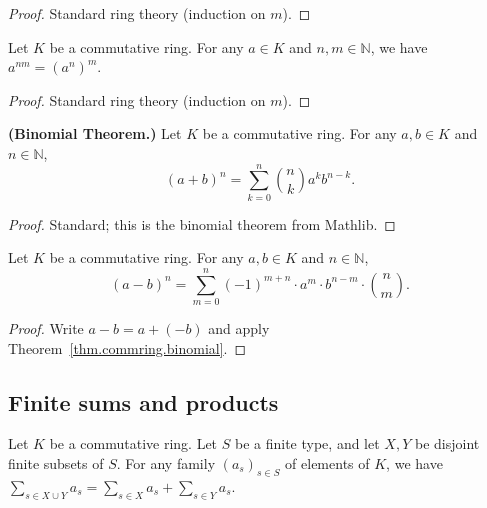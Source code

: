 \begin{proof}
\leanok
Standard ring theory (induction on $m$).
\end{proof}

\begin{lemma}
\label{lem.commring.pow-mul}
\leanhelper
\leanok
Let $K$ be a commutative ring. For any $a\in K$ and $n,m\in\mathbb{N}$, we have
$a^{nm}=\left(  a^{n}\right)  ^{m}$.
\end{lemma}

\begin{proof}
\leanok
Standard ring theory (induction on $m$).
\end{proof}

\begin{theorem}
\label{thm.commring.binomial}
\leanhelper
\leanok
\textbf{(Binomial Theorem.)}
Let $K$ be a commutative ring. For any $a,b\in K$ and $n\in\mathbb{N}$,
\[
(a+b)^n = \sum_{k=0}^{n} \binom{n}{k} a^k b^{n-k}.
\]
\end{theorem}

\begin{proof}
Standard; this is the binomial theorem from Mathlib.
\end{proof}

\begin{lemma}
\label{lem.commring.binomial-sub}
\leanhelper
\leanok
Let $K$ be a commutative ring. For any $a,b\in K$ and $n\in\mathbb{N}$,
\[
(a-b)^n = \sum_{m=0}^{n} (-1)^{m+n} \cdot a^m \cdot b^{n-m} \cdot \binom{n}{m}.
\]
\end{lemma}

\begin{proof}
\leanok
Write $a - b = a + (-b)$ and apply Theorem~\ref{thm.commring.binomial}.
\end{proof}


\subsection{Finite sums and products}

\begin{lemma}
\label{lem.commring.sum-disjoint}
\leanhelper
\leanok
Let $K$ be a commutative ring. Let $S$ be a finite type, and let
$X, Y$ be disjoint finite subsets of $S$. For any family $(a_s)_{s \in S}$
of elements of $K$, we have
$\sum_{s\in X\cup Y}a_{s}=\sum_{s\in X}a_{s}+\sum_{s\in Y}a_{s}$.
\end{lemma}

